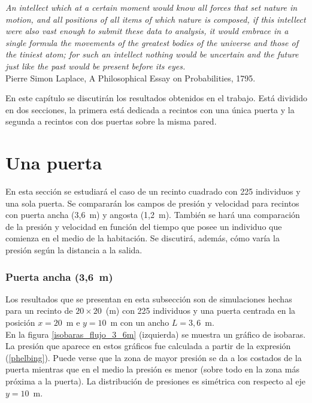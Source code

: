 \label{resultados}

\begin{flushleft}
 {\footnotesize{ \textsl {An intellect which at a certain moment would know all forces that set nature in motion, and all positions of all items of which nature is composed, if this intellect were also vast enough to submit these data to analysis, it would embrace in a single formula the movements of the greatest bodies of the universe and those of the tiniest atom; for such an intellect nothing would be uncertain and the future just like the past would be present before its eyes.}}} \\
\footnotesize  Pierre Simon Laplace, A Philosophical Essay on Probabilities, 1795.\\
\end{flushleft}

En este capítulo se discutirán los resultados obtenidos en el trabajo. Está dividido en dos secciones, la primera está dedicada a recintos con una única puerta y la segunda a recintos con dos puertas sobre la misma pared.  

\section{\label{una_puerta} Una puerta}

En esta sección se estudiará el caso de un recinto cuadrado con 225 individuos y una sola puerta. Se compararán los campos de presión y velocidad para recintos con puerta ancha (3,6~m) y angosta (1,2~m). También se hará una comparación de la presión y velocidad en función del tiempo que posee un individuo que comienza en el medio de la habitación. Se discutirá, además, cómo varía la presión según la distancia a la salida.     

\subsubsection{Puerta ancha (3,6~m)}

Los resultados que se presentan en esta subsección son de simulaciones hechas para un recinto de  $20\times 20$~(m) con 225 individuos y una puerta centrada en la posición $x=20$~m e $y=10$~m con un ancho $L=3,6$~m.\\

En la figura \ref{isobaras_flujo_3_6m} (izquierda) se muestra un gráfico de isobaras. La presión que aparece en estos gráficos fue calculada a partir de la expresión (\ref{phelbing}). Puede verse que la zona de mayor presión se da a los costados de la puerta mientras que en el medio la presión es menor (sobre todo en la zona más próxima a la puerta). La distribución de presiones es simétrica con respecto al eje $y=10$~m.  

